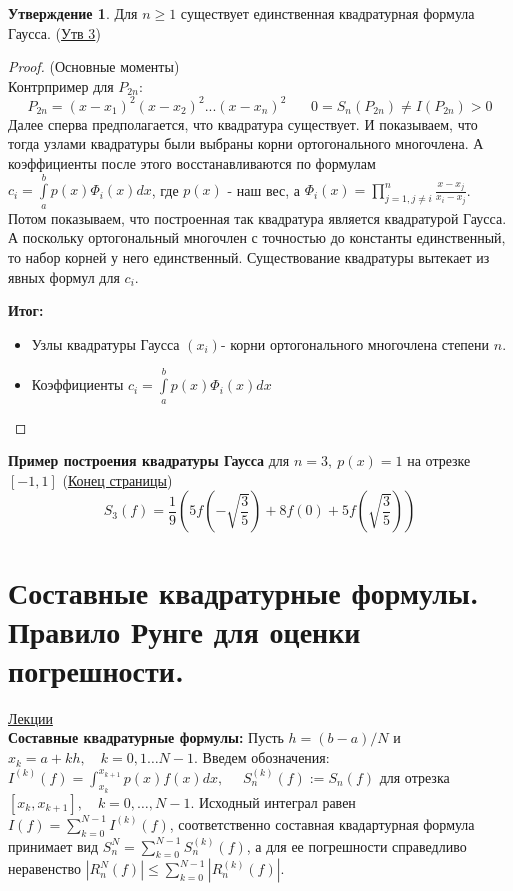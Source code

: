 \documentclass[specialist, subf, href, colorlinks=true, 12pt, times, mtpro, final]{disser}
\theoremstyle{definition}
\newtheorem{state}{Утверждение}[section]
\begin{document}
    \begin{state}
        Для $n \ge 1$ существует единственная квадратурная формула Гаусса. (\hyperlink {lects.42}{Утв 3})
    \end{state}
    \begin{proof} (Основные моменты) \\
        Контрпример для $P_{2n}$:
        $$
            P_{2n} = (x-x_1)^2 (x-x_2)^2 ... (x-x_n)^2 \ \ \ \ \ \ \ \ 0=S_n(P_{2n}) \ne I(P_{2n}) > 0
        $$
        Далее сперва предполагается, что квадратура существует. И показываем, что тогда узлами квадратуры были выбраны корни ортогонального многочлена.
        А коэффициенты после этого восстанавливаются по формулам $c_i = \int\limits_a^b p(x)\Phi_i(x)dx$, где $p(x)$ - наш вес, а $\Phi_i(x) = \prod\limits_{j = 1, j\ne i}^n \frac{x-x_j}{x_i-x_j}$. \\
        Потом показываем, что построенная так квадратура является квадратурой Гаусса.\\
        А поскольку ортогональный многочлен с точностью до константы единственный, то набор корней у него единственный. Существование квадратуры вытекает из явных формул для $c_i$.
        
        \textbf{Итог:}
        \begin{itemize}
            \item Узлы квадратуры Гаусса $(x_i)$- корни ортогонального многочлена степени $n$.
            \item Коэффициенты  $c_i = \int\limits_a^b p(x)\Phi_i(x)dx$
        \end{itemize}
        
    \end{proof}
    \noindent\textbf{Пример построения квадратуры Гаусса} для $n=3, \ p(x) = 1$ на отрезке $[-1,1]$ (\hyperlink {lects.42}{Конец страницы}) 
    $$
        S_3(f) = \frac{1}{9} \left( 5f\left( -\sqrt{\frac{3}{5}} \right) + 8f(0) + 5f\left( \sqrt{\frac{3}{5}} \right) \right)
    $$

\section {Составные квадратурные формулы. Правило Рунге для оценки погрешности.}
    \hyperlink {lects.44}{Лекции}\\
    \textbf{Составные квадратурные формулы:}
    Пусть $h = (b-a)/N$ и $x_k = a + kh, \quad k = 0, 1 \ldots N-1$. Введем обозначения: $I^{(k)}(f) = \int_{x_k}^{x_{k+1}} p(x)f(x)dx,$ $\quad S^{(k)}_n(f) := S_n(f)$ для отрезка $[x_k, x_{k+1}], \quad k = 0, \ldots, N-1$. Исходный интеграл равен $I(f) = \sum_{k=0}^{N-1}I^{(k)}(f)$, соответственно составная квадартурная формула принимает вид $S^N_n = \sum_{k=0}^{N-1} S_n^{(k)}(f)$, а для ее погрешности справедливо неравенство $|R_n^N(f)| \leq \sum_{k=0}^{N-1}|R_n^{(k)}(f)|$.
    
\end{document}
